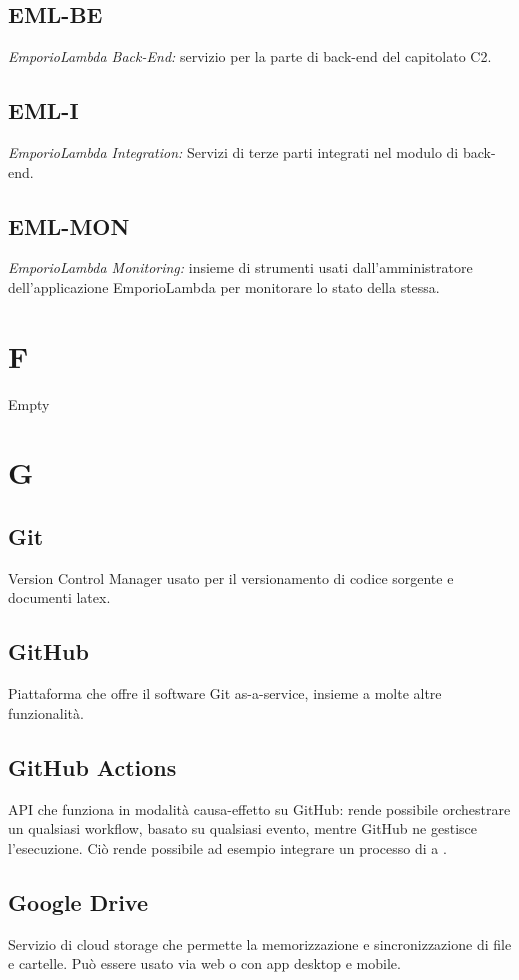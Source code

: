 \subsection*{EML-BE}
\textit{EmporioLambda Back-End:} servizio per la parte di back-end del capitolato C2.

\subsection*{EML-I}
\textit{EmporioLambda Integration:} Servizi di terze parti integrati nel modulo di back-end.

\subsection*{EML-MON}
\textit{EmporioLambda Monitoring:} insieme di strumenti usati dall'amministratore dell'applicazione EmporioLambda
per monitorare lo stato della stessa.

\section*{F}
Empty

\section*{G}
\subsection*{Git}
Version Control Manager usato per il versionamento di codice sorgente e documenti latex.

\subsection*{GitHub}
Piattaforma che offre il software Git as-a-service, insieme a molte altre funzionalità.

\subsection*{GitHub Actions}
API che funziona in modalità causa-effetto su GitHub: rende possibile orchestrare un qualsiasi workflow, basato su qualsiasi evento, mentre GitHub ne gestisce l’esecuzione. Ciò rende possibile ad esempio integrare un processo di  a .

\subsection*{Google Drive}
Servizio di cloud storage che permette la memorizzazione e sincronizzazione di file e cartelle. Può essere usato via web o con app desktop e mobile.

